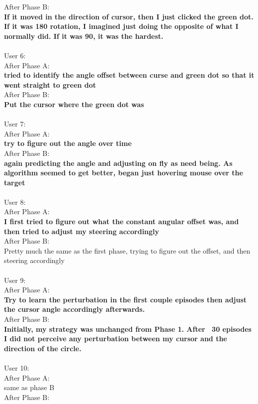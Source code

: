 \documentclass{article}
\begin{document}
\begin{displayquote}
After Phase B: \\
\textbf{If it moved in the direction of cursor, then I just clicked the green dot. If it was 180 rotation, I imagined just doing the opposite of what I normally did. If it was 90, it was the hardest.} \\
\\
User 6: \\
After Phase A: \\
\textbf{tried to identify the angle offset between curse and green dot so that it went straight to green dot} \\
After Phase B: \\
\textbf{Put the cursor where the green dot was} \\
\\
User 7: \\
After Phase A: \\
\textbf{try to figure out the angle over time} \\
After Phase B: \\
\textbf{again predicting the angle and adjusting on fly as need being. As algorithm seemed to get better, began just hovering mouse over the target} \\
\\
User 8: \\
After Phase A: \\
\textbf{I first tried to figure out what the constant angular offset was, and then tried to adjust my steering accordingly} \\
After Phase B: \\
Pretty much the same as the first phase, trying to figure out the offset, and then steering accordingly  \\
\\
User 9: \\
After Phase A: \\
\textbf{Try to learn the perturbation in the first couple episodes then adjust the cursor angle accordingly afterwards.} \\
After Phase B: \\
\textbf{Initially, my strategy was unchanged from Phase 1. After ~30 episodes I did not perceive any perturbation between my cursor and the direction of the circle.} \\
\\
User 10: \\
After Phase A: \\
same as phase B \\
After Phase B: \\

\end{displayquote}
\end{document}

